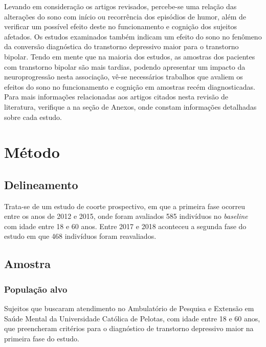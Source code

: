 \documentclass[chapter=TITLE,
               oneside,
               12pt,
               a4paper,
               english,
               brazil]{abntex2}    %
\begin{document}
        Levando em consideração os artigos revisados, percebe-se uma relação
        das alterações do sono com início ou recorrência dos episódios de humor,
        além de verificar um possível efeito deste no funcionamento e cognição
        dos sujeitos afetados.
        Os estudos examinados também indicam um efeito do sono no fenômeno
        da conversão diagnóstica do transtorno depressivo maior para o transtorno
        bipolar.
        Tendo em mente que na maioria dos estudos, as amostras dos pacientes
        com transtorno bipolar são mais tardias, podendo apresentar um impacto
        da neuroprogressão nesta associação, vê-se necessários trabalhos que
        avaliem os efeitos do sono no funcionamento e cognição em amostras recém
        diagnosticadas.
        Para mais informações relacionadas aos artigos citados nesta revisão
        de literatura, verifique a  na seção de Anexos,
        onde constam informações detalhadas sobre cada estudo.

\vspace{\onelineskip}
\chapter{Método}\label{sec:metodo}

    \section{Delineamento}\label{sec:delineamento}

        Trata-se de um estudo de coorte prospectivo, em que a primeira fase ocorreu
        entre os anos de 2012 e 2015, onde foram avaliados 585 indivíduos no
        \textit{baseline} com idade entre 18 e 60 anos.
        Entre 2017 e 2018 aconteceu a segunda fase do estudo em que 468 indivíduos
        foram reavaliados.

    \section{Amostra}\label{sec:sujeitos}

        \subsection{População alvo}

            Sujeitos que buscaram atendimento no Ambulatório de Pesquisa e Extensão
            em Saúde Mental da Universidade Católica de Pelotas, com idade entre 18
            e 60 anos, que preencheram critérios para o diagnóstico de transtorno
            depressivo maior na primeira fase do estudo.
\end{document}
